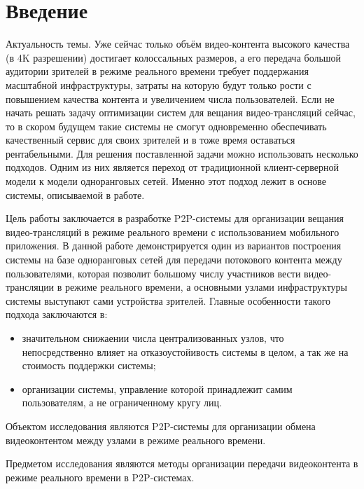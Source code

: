 
\nocite{*}
\tableofcontents

\section*{Введение}
	Актуальность темы. Уже сейчас только объём видео-контента высокого качества (в 4K разрешении) достигает
	колоссальных размеров, а его передача большой аудитории зрителей в режиме реального времени требует поддержания
	масштабной инфраструктуры, затраты на которую будут только рости с повышением качества контента и увеличением числа
	пользователей. Если не начать решать задачу оптимизации систем для вещания видео-трансляций сейчас, то в
	скором будущем такие системы не смогут одновременно обеспечивать качественный сервис для своих зрителей и в тоже
	время оставаться рентабельными. Для решения поставленной задачи можно использовать несколько подходов. Одним из них
	является переход от традиционной клиент-серверной модели к модели одноранговых сетей. Именно этот подход лежит в
	основе системы, описываемой в работе.

	Цель работы заключается в разработке P2P-системы для организации вещания видео-трансляций в режиме
	реального времени с использованием мобильного приложения. В данной работе демонстрируется один из вариантов
	построения системы на базе одноранговых сетей для передачи потокового контента между пользователями, которая
	позволит большому числу участников вести  видео-трансляции в режиме реального времени, а основными узлами
	инфраструктуры системы выступают сами устройства зрителей. Главные особенности такого подхода заключаются в:
	\begin{itemize}
		\item значительном снижаении числа централизованных узлов, что непосредственно влияет на отказоустойивость
		системы в целом, а так же на стоимость поддержки системы;
		\item организации системы, управление которой принадлежит самим пользователям, а не ограниченному кругу лиц.
	\end{itemize}

	Объектом исследования являются P2P-системы для организации обмена видеоконтентом между узлами в режиме
	реального времени.

	Предметом исследования являются методы организации передачи видеоконтента в режиме реального времени в
	P2P-системах.

